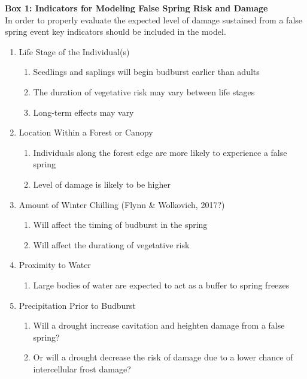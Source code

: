 \documentclass{article}\usepackage[]{graphicx}\usepackage[]{color}
\begin{document}
\newpage
\captionsetup[table]{textformat=empty,labelformat=empty}
\begin{siderules}
\textbf {Box 1: Indicators for Modeling False Spring Risk and Damage}\\
In order to properly evaluate the expected level of damage sustained from a false spring event
key indicators should be included in the model.
\renewcommand{\theenumi}{\Roman{enumi}}
\renewcommand{\theenumii}{\roman{enumii}}
\begin{enumerate}
  \item Life Stage of the Individual(s) \citep{Caffarra2011}
  \begin{enumerate}
    \item Seedlings and saplings will begin budburst earlier than adults
    \item The duration of vegetative risk may vary between life stages
    \item Long-term effects may vary
  \end{enumerate}
  \item Location Within a Forest or Canopy \citep{Augspurger2013}
  \begin{enumerate}
    \item Individuals along the forest edge are more likely to experience a false spring
    \item Level of damage is likely to be higher
  \end{enumerate}
  \item Amount of Winter Chilling (Flynn \& Wolkovich, 2017?)
  \begin{enumerate}
    \item Will affect the timing of budburst in the spring
    \item Will affect the durationg of vegetative risk
  \end{enumerate}
  \item Proximity to Water %
  \begin{enumerate}
    \item Large bodies of water are expected to act as a buffer to spring freezes
  \end{enumerate}
  \item Precipitation Prior to Budburst \citep{Anderegg2013}
  \begin{enumerate}
    \item Will a drought increase cavitation and heighten damage from a false spring?
    \item Or will a drought decrease the risk of damage due to a lower chance of intercellular frost damage?

\end{enumerate}
\end{enumerate}
\end{siderules}
\end{document}
